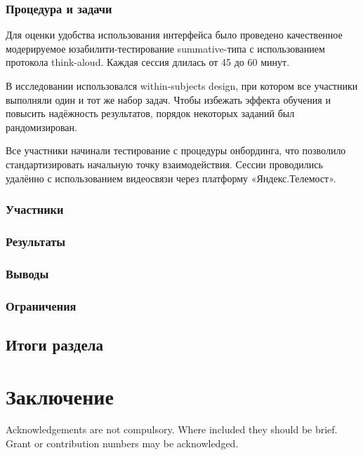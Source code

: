 \documentclass[pdflatex,sn-mathphys-num]{sn-jnl}%
\theoremstyle{thmstyleone}%
\theoremstyle{thmstyletwo}%
\theoremstyle{thmstylethree}%
\begin{document}
\subsubsection{Процедура и задачи}

Для оценки удобства использования интерфейса было проведено качественное модерируемое юзабилити-тестирование summative-типа с использованием протокола think-aloud. Каждая сессия длилась от 45 до 60 минут.

В исследовании использовался within-subjects design, при котором все участники выполняли один и тот же набор задач. Чтобы избежать эффекта обучения и повысить надёжность результатов, порядок некоторых заданий был рандомизирован.

Все участники начинали тестирование с процедуры онбординга, что позволило стандартизировать начальную точку взаимодействия. Сессии проводились удалённо с использованием видеосвязи через платформу «Яндекс.Телемост».

\subsubsection{Участники}

\subsubsection{Результаты}

\subsubsection{Выводы}

\subsubsection{Ограничения}

\subsection{Итоги раздела}

\section{Заключение}\label{sec6}

\backmatter


Acknowledgements are not compulsory. Where included they should be brief. Grant or contribution numbers may be acknowledged.
\end{document}
